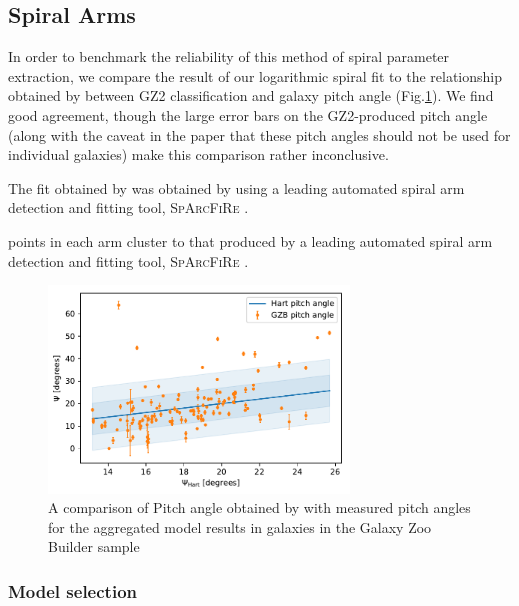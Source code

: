 \documentclass[../main.tex]{subfiles}
\begin{document}




\subsection{Spiral Arms}

In order to benchmark the reliability of this method of spiral parameter extraction, we compare the result of our logarithmic spiral fit to the relationship obtained by \citet{Hart2016:1607.01019v1} between GZ2 classification and galaxy pitch angle (Fig.\ref{fig:hart_pitch_angle}). We find good agreement, though the large error bars on the GZ2-produced pitch angle (along with the caveat in the paper that these pitch angles should not be used for individual galaxies) make this comparison rather inconclusive.

The fit obtained by \citet{Hart2016:1607.01019v1} was obtained by using a leading automated spiral arm detection and fitting tool, \textsc{SpArcFiRe} \citep{Davis2014:1402.1910v1}.

points in each arm cluster to that produced by a leading automated spiral arm detection and fitting tool, \textsc{SpArcFiRe} \citep{Davis2014:1402.1910v1}.

\begin{figure}
  \includegraphics[width=8cm]{images__results/pitch-angle-comparison.pdf}
  \caption{A comparison of Pitch angle obtained by \citet{Hart2016:1607.01019v1} with measured pitch angles for the aggregated model results in galaxies in the Galaxy Zoo Builder sample}
  \label{fig:hart_pitch_angle}
\end{figure}



\subsubsection{Model selection}
\end{document}
